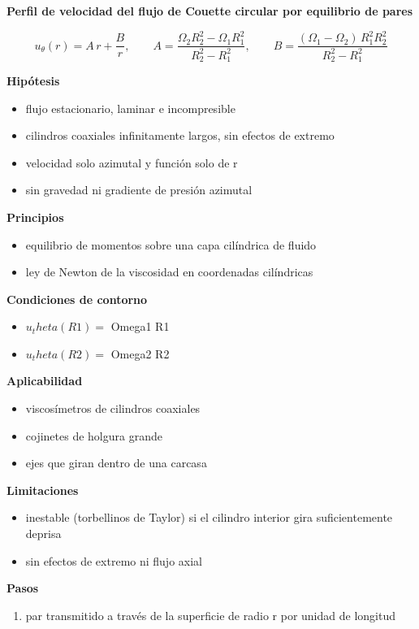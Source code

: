 \documentclass[10pt,openany]{book}
\begin{document}
\begin{tcolorbox}[title={Desarrollos del modelo}, studiumdef, breakable]
\noindent\textbf{Perfil de velocidad del flujo de Couette circular por equilibrio de pares}

\[
u_\theta(r) = A\,r + \frac{B}{r},\qquad A = \frac{\Omega_2 R_2^{2} - \Omega_1 R_1^{2}}{R_2^{2} - R_1^{2}},\qquad B = \frac{(\Omega_1 - \Omega_2)\,R_1^{2} R_2^{2}}{R_2^{2} - R_1^{2}}
\]

\noindent\textbf{Hipótesis}
\begin{itemize}
\item flujo estacionario, laminar e incompresible
\item cilindros coaxiales infinitamente largos, sin efectos de extremo
\item velocidad solo azimutal y función solo de r
\item sin gravedad ni gradiente de presión azimutal
\end{itemize}

\noindent\textbf{Principios}
\begin{itemize}
\item equilibrio de momentos sobre una capa cilíndrica de fluido
\item ley de Newton de la viscosidad en coordenadas cilíndricas
\end{itemize}

\noindent\textbf{Condiciones de contorno}
\begin{itemize}
\item \(u_theta(R1) =\) Omega1 R1
\item \(u_theta(R2) =\) Omega2 R2
\end{itemize}

\noindent\textbf{Aplicabilidad}
\begin{itemize}
\item viscosímetros de cilindros coaxiales
\item cojinetes de holgura grande
\item ejes que giran dentro de una carcasa
\end{itemize}

\noindent\textbf{Limitaciones}
\begin{itemize}
\item inestable (torbellinos de Taylor) si el cilindro interior gira suficientemente deprisa
\item sin efectos de extremo ni flujo axial
\end{itemize}

\noindent\textbf{Pasos}
\begin{enumerate}
\item
par transmitido a través de la superficie de radio r por unidad de longitud


\end{enumerate}
\end{tcolorbox}
\end{document}
